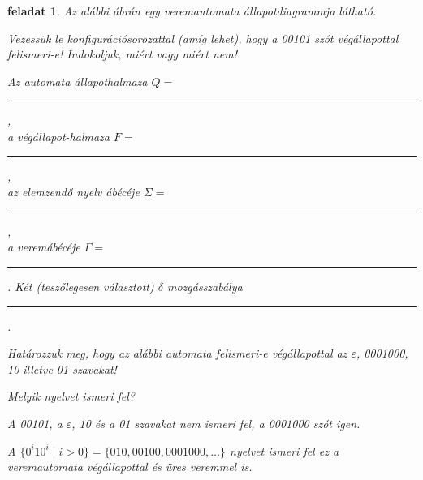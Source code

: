 \documentclass[a4paper]{article}
\newtheorem{feladat}{feladat}[section]
\newcommand{\spacer}[1][2 cm]{\rule{#1}{.4pt}\rule{0pt}{2em} }
\begin{document}
\begin{feladat}%
Az alábbi ábrán egy veremautomata állapotdiagrammja látható.


Vezessük le konfigurációsorozattal (amíg lehet), hogy a 00101 szót
végállapottal felismeri-e! Indokoljuk, miért vagy miért nem!

Az automata állapothalmaza $Q=$~\spacer[.4\linewidth],\\
a végállapot-halmaza $F=$~\spacer[.5\linewidth],\\
az elemzendő nyelv ábécéje $\Sigma=$~\spacer,\\
a veremábécéje $\Gamma=$~\spacer.
Két (teszőlegesen választott) $\delta$ mozgásszabálya\\ \spacer[.95\linewidth].

Határozzuk meg, hogy az alábbi automata felismeri-e végállapottal az
$\varepsilon$, 0001000, 10 illetve 01 szavakat!

Melyik nyelvet ismeri fel?

\begin{megoldas}
A 00101, a $\varepsilon$, 10 és a 01 szavakat nem ismeri fel, a 0001000 szót
igen.

A $\{0^i10^i \mid i>0\}=\{010, 00100, 0001000, \ldots\}$ nyelvet ismeri
fel ez a veremautomata végállapottal és üres veremmel is.
\end{megoldas}
\end{feladat}
\end{document}
